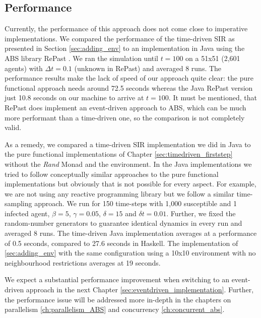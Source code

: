 \subsection{Performance}
Currently, the performance of this approach does not come close to imperative implementations. We compared the performance of the time-driven SIR as presented in Section \ref{sec:adding_env} to an implementation in Java using the ABS library RePast \cite{north_complex_2013}. We ran the simulation until $t = 100$ on a 51x51 (2,601 agents) with $\Delta t = 0.1$ (unknown in RePast) and averaged 8 runs. The performance results make the lack of speed of our approach quite clear: the pure functional approach needs around 72.5 seconds whereas the Java RePast version just 10.8 seconds on our machine to arrive at $t = 100$. It must be mentioned, that RePast does implement an event-driven approach to ABS, which can be much more performant \cite{meyer_event-driven_2014} than a time-driven one, so the comparison is not completely valid.

As a remedy, we compared a time-driven SIR implementation we did in Java to the pure functional implementations of Chapter \ref{sec:timedriven_firststep} without the \textit{Rand} Monad and the environment. In the Java implementations we tried to follow conceptually similar approaches to the pure functional implementations but obviously that is not possible for every aspect. For example, we are not using any reactive programming library but we follow a similar time-sampling approach. We run for 150 time-steps with 1,000 susceptible and 1 infected agent, $\beta = 5$, $\gamma = 0.05$, $\delta = 15$ and $\delta t = 0.01$. Further, we fixed the random-number generators to guarantee identical dynamics in every run and averaged 8 runs. The time-driven Java implementation averages at a performance of 0.5 seconds, compared to 27.6 seconds in Haskell. The implementation of \ref{sec:adding_env} with the same configuration using a 10x10 environment with no neighbourhood restrictions averages at 19 seconds.

We expect a substantial performance improvement when switching to an event-driven approach \cite{meyer_event-driven_2014} in the next Chapter \ref{sec:eventdriven_implementation}. Further, the performance issue will be addressed more in-depth in the chapters on parallelism \ref{ch:parallelism_ABS} and concurrency \ref{ch:concurrent_abs}.